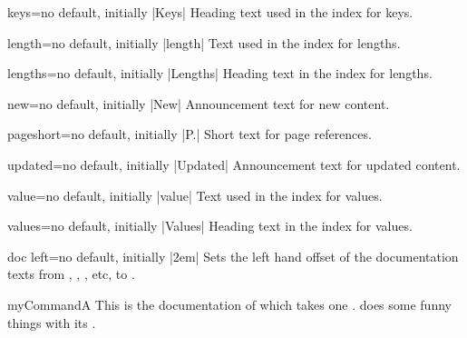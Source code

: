 \begin{langTcbKey}{keys}{=}{no default, initially |Keys|}
  Heading text used in the index for keys.
\end{langTcbKey}

\begin{langTcbKey}[][doc new={2015-01-08}]{length}{=}{no default, initially |length|}
  Text used in the index for lengths.
\end{langTcbKey}

\begin{langTcbKey}[][doc new={2015-01-08}]{lengths}{=}{no default, initially |Lengths|}
  Heading text in the index for lengths.
\end{langTcbKey}


\begin{langTcbKey}[][doc new={2014-09-19}]{new}{=}{no default, initially |New|}
  Announcement text for new content.
\end{langTcbKey}

\begin{langTcbKey}{pageshort}{=}{no default, initially |P.|}
  Short text for page references.
\end{langTcbKey}

\begin{langTcbKey}[][doc new={2014-09-19}]{updated}{=}{no default, initially |Updated|}
  Announcement text for updated content.
\end{langTcbKey}

\begin{langTcbKey}{value}{=}{no default, initially |value|}
  Text used in the index for values.
\end{langTcbKey}

\begin{langTcbKey}{values}{=}{no default, initially |Values|}
  Heading text in the index for values.
\end{langTcbKey}



\clearpage
\begin{docTcbKey}{doc left}{=}{no default, initially |2em|}
  Sets the left hand offset of the documentation texts from
  , , , etc, to .
\begin{dispExample}
\begin{docCommand*}[doc left=2cm,doc left indent=-2cm]{myCommandA}{}
  This is the documentation of  which takes one .
   does some funny things with its .
\end{docCommand*}
\end{dispExample}
\end{docTcbKey}

